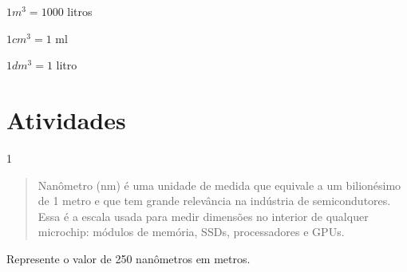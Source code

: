\begin{escolha}
\begin{escolha}
\begin{escolha}
\begin{escolha}
{\begin{boxmedio}
\begin{boxpeq}
\begin{q°}
\begin{boxmedio}
\begin{boxpeq}
\begin{boxpeq}
\begin{boxmedio}
\begin{boxmedio}
\begin{boxmedio}
\begin{largebox}
\begin{boxmedio}
{\begin{enumerate}
$1 m^3 = 1000$ litros

$1 cm^3 = 1$ ml

$1 dm^3 = 1$ litro

\section{Atividades}

\num{1} 

\begin{quote}
Nanômetro (nm) é uma unidade de medida que equivale a um bilionésimo
de 1 metro e que tem grande relevância na indústria de semicondutores.
Essa é a escala usada para medir dimensões no interior de qualquer
microchip: módulos de memória, SSDs, processadores e GPUs.
\end{quote}


Represente o valor de 250 nanômetros em metros.

\begin{boxpeq}

\end{boxpeq}
\end{enumerate}}
\end{boxmedio}
\end{largebox}
\end{boxmedio}
\end{boxmedio}
\end{boxmedio}
\end{boxpeq}
\end{boxpeq}
\end{boxmedio}
\end{q°}
\end{boxpeq}
\end{boxmedio}}
\end{escolha}
\end{escolha}
\end{escolha}
\end{escolha}
